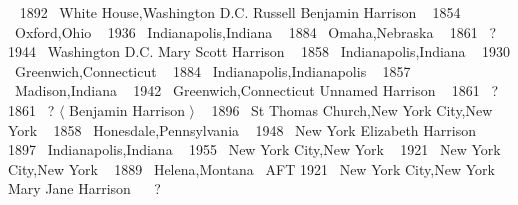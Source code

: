 {{ \dtag\ { \oct{} 1892} {\placefont \at\ }{\placefont White House,Washington D.C.}
% 
{\descfont Russell Benjamin Harrison}
\sepline 
{} \btag\ { \aug{} 1854} {\placefont \at\ }{\placefont Oxford,Ohio}
 \dtag\ { \dec{} 1936} {\placefont \at\ }{\placefont Indianapolis,Indiana}
 \mtag\ { \jan{} 1884} {\placefont \at\ }{\placefont Omaha,Nebraska}
 \btag\ { \nov{} 1861} {\placefont \at\ }{\placefont  ? }
 \dtag\ { \nov{} 1944} {\placefont \at\ }{\placefont Washington D.C.}
\endsubtree 
{}%
{\descfont Mary Scott Harrison}
\sepline 
{} \btag\ { \apr{} 1858} {\placefont \at\ }{\placefont Indianapolis,Indiana}
 \dtag\ { \oct{} 1930} {\placefont \at\ }{\placefont Greenwich,Connecticut}
 \mtag\ { \nov{} 1884} {\placefont \at\ }{\placefont Indianapolis,Indianapolis}
 \btag\ { \dec{} 1857} {\placefont \at\ }{\placefont Madison,Indiana}
 \dtag\ { \oct{} 1942} {\placefont \at\ }{\placefont Greenwich,Connecticut}
\endsubtree 
{}%
{\descfont Unnamed Harrison}
 \btag\ { \jun{} 1861} {\placefont \at\ }{\placefont  ? }
 \dtag\ { \jun{} 1861} {\placefont \at\ }{\placefont  ? }
\endsubtree 
\endsubtree 
{}%
{$\langle$ \descfont Benjamin Harrison $\rangle$}
 \mtag\ { \apr{} 1896} {\placefont \at\ }{\placefont St Thomas Church,New York City,New York}
 \btag\ { \apr{} 1858} {\placefont \at\ }{\placefont Honesdale,Pennsylvania}
 \dtag\ { \jan{} 1948} {\placefont \at\ }{\placefont New York}
% 
{\descfont Elizabeth Harrison}
\sepline 
{} \btag\ { \feb{} 1897} {\placefont \at\ }{\placefont Indianapolis,Indiana}
 \dtag\ { \dec{} 1955} {\placefont \at\ }{\placefont New York City,New York}
 \mtag\ { \apr{} 1921} {\placefont \at\ }{\placefont New York City,New York}
 \btag\ { \jan{} 1889} {\placefont \at\ }{\placefont Helena,Montana}
 \dtag\ {\datefont AFT    \apr{} 1921} {\placefont \at\ }{\placefont New York City,New York}
\endsubtree 
\endsubtree 
{}%
{\descfont Mary Jane Harrison}
\sepline 
{} \btag\ {} {\placefont \at\ }{\placefont  ? }
}}

